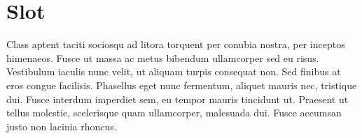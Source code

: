 \documentclass[a4paper,10pt,titlepage]{article}
\def\s{\section}                              %
\begin{document}
\s{Slot}

Class aptent taciti sociosqu ad litora torquent per conubia nostra, per inceptos himenaeos. Fusce ut massa ac metus bibendum ullamcorper sed eu risus. Vestibulum iaculis nunc velit, ut aliquam turpis consequat non. Sed finibus at eros congue facilisis. Phasellus eget nunc fermentum, aliquet mauris nec, tristique dui. Fusce interdum imperdiet sem, eu tempor mauris tincidunt ut. Praesent ut tellus molestie, scelerisque quam ullamcorper, malesuada dui. Fusce accumsan justo non lacinia rhoncus.
\end{document}
